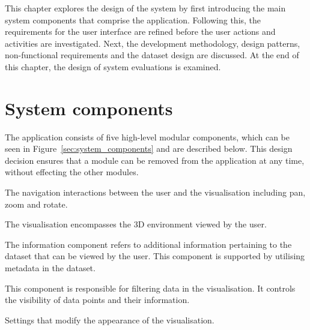 
This chapter explores the design of the system by first introducing the main system components that comprise the application. Following this, the requirements for the user interface are refined before the user actions and activities are investigated. Next, the development methodology, design patterns, non-functional requirements and the dataset design are discussed. At the end of this chapter, the design of system evaluations is examined.

\section{System components} {
\label{sec:system_components}

	The application consists of five high-level modular components, which can be seen in Figure~\ref{sec:system_components} and are described below. This design decision ensures that a module can be removed from the application at any time, without effecting the other modules.

	\begin{description}[leftmargin=0pt]
		\item[Navigation:] The navigation interactions between the user and the visualisation including pan, zoom and rotate.
		\item[Visualisation:] The visualisation encompasses the 3D environment viewed by the user.
		\item[Information:] The information component refers to additional information pertaining to the dataset that can be viewed by the user. This component is supported by utilising metadata in the dataset.
		\item[Filtering:] This component is responsible for filtering data in the visualisation. It controls the visibility of data points and their information.
		\item[Configurations:] Settings that modify the appearance of the visualisation.
	\end{description}

	

}


